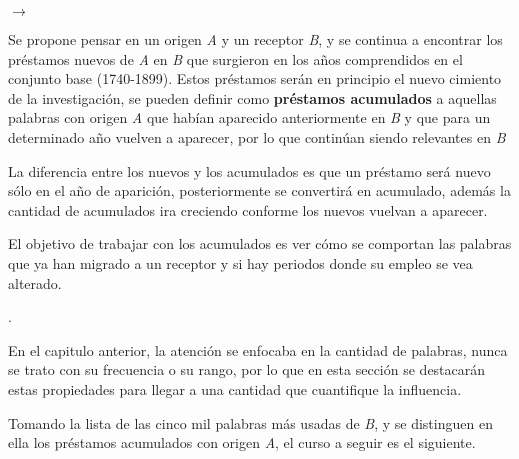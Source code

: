 $\rightarrow$


Se propone pensar en un origen \textit{A} y un receptor \textit{B}, y se continua a encontrar los  préstamos nuevos de \textit{A} en \textit{B} que surgieron en los años  comprendidos en el conjunto base (1740-1899).  Estos préstamos serán en principio el nuevo cimiento de la investigación,
se pueden definir como \textbf{préstamos acumulados} a aquellas palabras  con origen \textit{A} que habían aparecido anteriormente  en  \textit{B} y que para un determinado año vuelven a aparecer, por lo que continúan siendo relevantes en \textit{B}



La diferencia entre los nuevos y los acumulados es que un préstamo será nuevo sólo en el año de aparición, posteriormente se convertirá en acumulado, además la cantidad de acumulados ira creciendo conforme los nuevos vuelvan a aparecer. 

El objetivo  de trabajar con los acumulados es ver cómo se comportan las palabras que ya han migrado a un receptor y si hay periodos donde su empleo se vea alterado. 


.  

En el capitulo anterior, la atención se enfocaba en la cantidad de palabras, nunca se trato con su frecuencia o su rango,  por lo que en esta sección se destacarán estas propiedades para llegar a una cantidad que cuantifique la influencia. 

Tomando la lista de las cinco mil palabras más usadas de \textit{B}, y se
distinguen en ella los préstamos acumulados con origen \textit{A}, el curso a seguir es el siguiente. 




